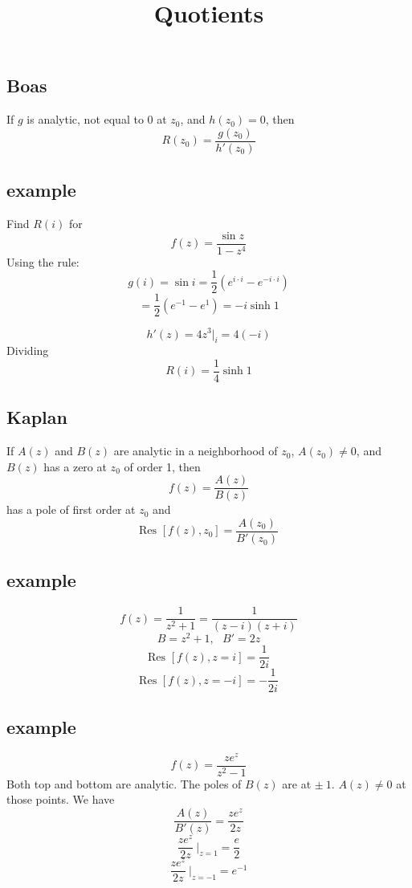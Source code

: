 \documentclass[11pt, oneside]{article}
\title{Quotients}
\date{}
\begin{document}
\maketitle
\Large



\subsection*{Boas}

If $g$ is analytic, not equal to $0$ at $z_0$, and $h(z_0) = 0$, then
\[ R(z_0) = \frac{g(z_0)}{h'(z_0)} \]

\subsection*{example}

\label{sec:ex31R}

Find $R(i)$ for 
\[ f(z) = \frac{\sin z}{1 - z^4} \]
Using the rule:
\[ g(i) = \sin i = \frac{1}{2} (e^{i \cdot i} - e^{-i \cdot i}) \]
\[ = \frac{1}{2} (e^{-1} - e^{1}) = -i \sinh 1 \]

\[ h'(z) = 4z^3 \bigg |_i = 4(- i) \]
Dividing 
\[ R(i) = \frac{1}{4} \sinh 1 \]

\subsection*{Kaplan}

If $A(z)$ and $B(z)$ are analytic in a neighborhood of $z_0$, $A(z_0) \ne 0$, and $B(z)$ has a zero at $z_0$ of order 1, then
\[ f(z) = \frac{A(z)}{B(z)} \]
has a pole of first order at $z_0$ and
\[ \text{Res } [f(z),z_0] = \frac{A(z_0)}{B'(z_0)} \]

\subsection*{example}

\label{sec:ex10R}

\[ f(z) = \frac{1}{z^2 + 1} = \frac{1}{(z - i)(z + i)} \]
\[ B = z^2 + 1, \ \ \ B' = 2z \]
\[ \text{Res } [f(z),z=i] = \frac{1}{2i} \]
\[ \text{Res } [f(z),z=-i] = -\frac{1}{2i} \]

\subsection*{example}

\label{sec:ex27R}

\[ f(z) = \frac{z e^z}{z^2 - 1} \]
Both top and bottom are analytic.  The poles of $B(z)$ are at $\pm \ 1$.  $A(z) \ne 0$ at those points.  We have 
\[ \frac{A(z)}{B'(z)} = \frac{z e^z}{2z} \]
\[ \frac{z e^z}{2z} \ \bigg |_{z=1} = \frac{e}{2} \]
\[ \frac{z e^z}{2z} \ \bigg |_{z=-1} = e^{-1} \]
\end{document}
